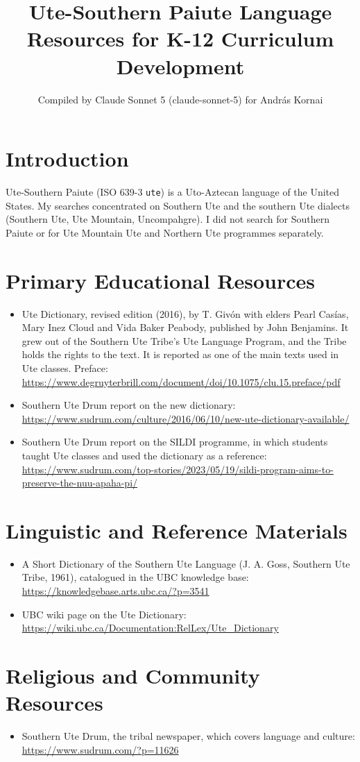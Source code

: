 \documentclass[12pt]{article}
\title{Ute-Southern Paiute Language Resources for K-12 Curriculum Development}
\author{Compiled by Claude Sonnet 5 (claude-sonnet-5) for Andr\'as Kornai}
\date{}
\begin{document}
\maketitle
\section{Introduction}
Ute-Southern Paiute (ISO 639-3 \texttt{ute}) is a Uto-Aztecan language of the United States. My searches concentrated on Southern Ute and the southern Ute dialects (Southern Ute, Ute Mountain, Uncompahgre). I did not search for Southern Paiute or for Ute Mountain Ute and Northern Ute programmes separately.
\section{Primary Educational Resources}
\begin{itemize}
\item Ute Dictionary, revised edition (2016), by T. Givón with elders Pearl Casías, Mary Inez Cloud and Vida Baker Peabody, published by John Benjamins. It grew out of the Southern Ute Tribe's Ute Language Program, and the Tribe holds the rights to the text. It is reported as one of the main texts used in Ute classes. Preface: \url{https://www.degruyterbrill.com/document/doi/10.1075/clu.15.preface/pdf}
\item Southern Ute Drum report on the new dictionary: \url{https://www.sudrum.com/culture/2016/06/10/new-ute-dictionary-available/}
\item Southern Ute Drum report on the SILDI programme, in which students taught Ute classes and used the dictionary as a reference: \url{https://www.sudrum.com/top-stories/2023/05/19/sildi-program-aims-to-preserve-the-nuu-apaha-pi/}
\end{itemize}
\section{Linguistic and Reference Materials}
\begin{itemize}
\item A Short Dictionary of the Southern Ute Language (J. A. Goss, Southern Ute Tribe, 1961), catalogued in the UBC knowledge base: \url{https://knowledgebase.arts.ubc.ca/?p=3541}
\item UBC wiki page on the Ute Dictionary: \url{https://wiki.ubc.ca/Documentation:RelLex/Ute_Dictionary}
\end{itemize}
\section{Religious and Community Resources}
\begin{itemize}
\item Southern Ute Drum, the tribal newspaper, which covers language and culture: \url{https://www.sudrum.com/?p=11626}
\end{itemize}
\end{document}
